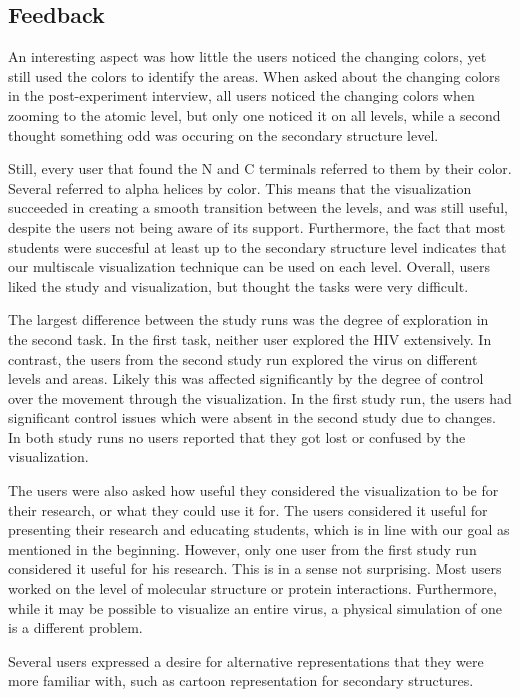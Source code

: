 \documentclass[review,journal]{vgtc}         %
\begin{document}
	
	
	
	\subsection{Feedback}
	An interesting aspect was how little the users noticed the changing colors, yet still used the colors to identify the areas.
	When asked about the changing colors in the post-experiment interview, all users noticed the changing colors when zooming to the atomic level, but only one noticed it on all levels, while a second thought something odd was occuring on the secondary structure level. 
	
	Still, every user that found the N and C terminals referred to them by their color. 
	Several referred to alpha helices by color. 
	This means that the visualization succeeded in creating a smooth transition between the levels, and was still useful, despite the users not being aware of its support. 
	Furthermore, the fact that most students were succesful at least up to the secondary structure level indicates that our multiscale visualization technique can be used on each level. 
	Overall, users liked the study and visualization, but thought the tasks were very difficult.
	
	
	The largest difference between the study runs was the degree of exploration in the second task. In the first task, neither user explored the HIV extensively. In contrast, the users from the second study run explored the virus on different levels and areas. Likely this was affected significantly by the degree of control over the movement through the visualization. In the first study run, the users had significant control issues which were absent in the second study due to changes. In both study runs no users reported that they got lost or confused by the visualization.
	
	The users were also asked how useful they considered the visualization to be for their research, or what they could use it for. The users considered it useful for presenting their research and educating students, which is in line with our goal as mentioned in the beginning. However, only one user from the first study run considered it useful for his research. This is in a sense not surprising. Most users worked on the level of molecular structure or protein interactions. Furthermore, while it may be possible to visualize an entire virus, a physical simulation of one is a different problem. 
	
	
	Several users expressed a desire for alternative representations that they were more familiar with, such as cartoon representation for secondary structures.
	
\end{document}
